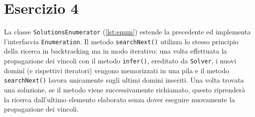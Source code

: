 \section*{Esercizio 4}

La classe {\tt SolutionsEnumerator} (\autoref{lst:enum}) estende la precedente
ed implementa l'interfaccia {\tt Enumeration}. Il metodo {\tt searchNext()}
utilizza lo stesso principio della ricerca in backtracking ma in modo iterativo:
una volta effettuata la propagazione dei vincoli con il metodo {\tt infer()},
ereditato da {\tt Solver}, i nuovi dominî (e rispettivi iteratori) vengono
memorizzati in una pila e il metodo {\tt searchNext()} lavora unicamente sugli
ultimi domini inseriti. Una volta trovata una soluzione, se il metodo viene
successivamente richiamato, questo riprenderà la ricerca dall'ultimo elemento
elaborato senza dover eseguire nuovamente la propagazione dei vincoli.


